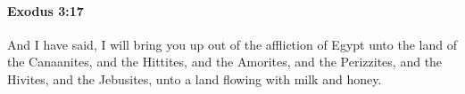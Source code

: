 
		\paragraph{Exodus 3:17} %
			\label{EXODUS-3-17}

			And I have said, I will bring you up out of the affliction of Egypt unto the land of the Canaanites, and the Hittites, and the Amorites, and the Perizzites, and the Hivites, and the Jebusites, unto a land flowing with milk and honey.


